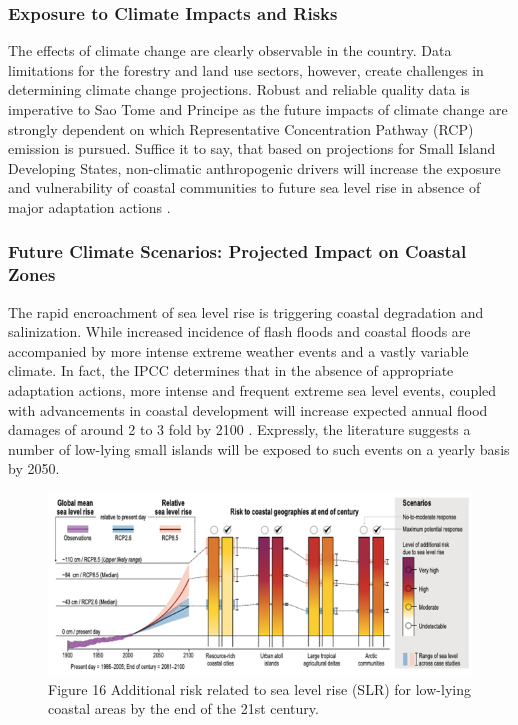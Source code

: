 \documentclass[
]{book}
\begin{document}
\hypertarget{exposure-to-climate-impacts-and-risks-16}{%
\subsubsection{Exposure to Climate Impacts and Risks}\label{exposure-to-climate-impacts-and-risks-16}}

The effects of climate change are clearly observable in the country. Data limitations for the forestry and land use sectors, however, create challenges in determining climate change projections. Robust and reliable quality data is imperative to Sao Tome and Principe as the future impacts of climate change are strongly dependent on which Representative Concentration Pathway (RCP) emission is pursued. Suffice it to say, that based on projections for Small Island Developing States, non-climatic anthropogenic drivers will increase the exposure and vulnerability of coastal communities to future sea level rise in absence of major adaptation actions .

\hypertarget{future-climate-scenarios-projected-impact-on-coastal-zones-1}{%
\subsubsection{Future Climate Scenarios: Projected Impact on Coastal Zones}\label{future-climate-scenarios-projected-impact-on-coastal-zones-1}}

The rapid encroachment of sea level rise is triggering coastal degradation and salinization. While increased incidence of flash floods and coastal floods are accompanied by more intense extreme weather events and a vastly variable climate. In fact, the IPCC determines that in the absence of appropriate adaptation actions, more intense and frequent extreme sea level events, coupled with advancements in coastal development will increase expected annual flood damages of around 2 to 3 fold by 2100 . Expressly, the literature suggests a number of low-lying small islands will be exposed to such events on a yearly basis by 2050.

\begin{figure}
\centering
\includegraphics{images/sealevel_rise.png}
\caption{Figure 16 Additional risk related to sea level rise (SLR) for low-lying coastal areas by the end of the 21st century.}
\end{figure}
\end{document}
